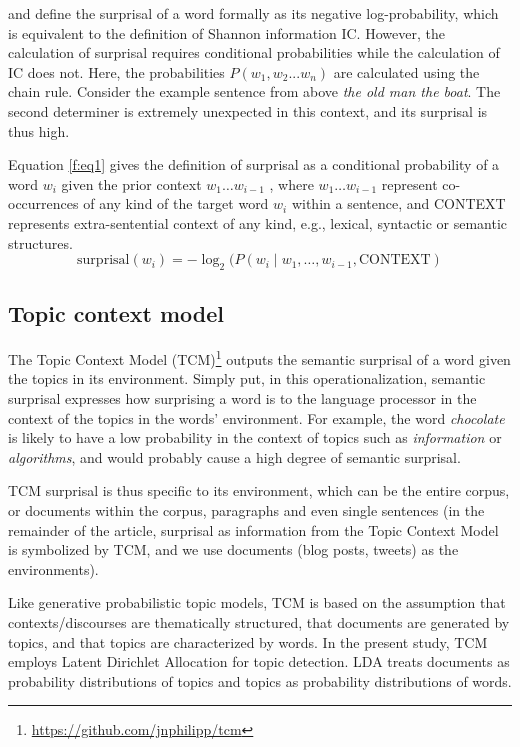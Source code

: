 \documentclass[output=paper,colorlinks,citecolor=brown]{langscibook}
\begin{document}
\citet{hale2001probabilistic} and \citet{hale2015modeling} define the surprisal of a word formally as its negative log-probability, which is equivalent to the definition of Shannon information IC. However, the calculation of surprisal requires conditional probabilities while the calculation of IC does not. Here, the probabilities $P(w_1, w_2 ... w_n)$ are calculated using the chain rule. Consider the example sentence from above \textit{the old man the boat}. The second determiner is extremely unexpected in this context, and its surprisal is  thus high. 

Equation \ref{f:eq1} gives the definition of surprisal as a conditional probability of a word $w_i$ given the prior context $w_1\dots w_{i-1}$ \citep{levy2008expectation}, where $w_1\dots w_{i-1}$  represent co-occurrences of any kind of the target word $w_i$ within a sentence, and CONTEXT represents extra-sentential context of any kind, e.g., lexical, syntactic or semantic structures.
\begin{equation}\label{f:eq1}
\mathrm{surprisal}(w_i) = -\log_2(P(w_i\mid w_1,\dots,w_{i-1}, \mathrm{CONTEXT})
\end{equation}

\subsection{Topic context model}

The Topic Context Model (TCM)\footnote{\url{https://github.com/jnphilipp/tcm}} \citep{koelbl2020keyword,koelbl2021semantic,philipp2022keyword,philipp2023idioms} outputs the semantic surprisal of a word given the topics in its environment. Simply put, in this operationalization, semantic surprisal expresses how surprising a word is to the language processor in the context of the topics in the words' environment. For example, the word \textit{chocolate} is likely to have a low probability in the context of topics such as \textit{information} or \textit{algorithms}, and would probably cause a high degree of semantic surprisal.

TCM surprisal is thus specific to its environment, which can be the entire corpus, or documents within the corpus, paragraphs and even single sentences (in the remainder of the article, surprisal as information from the Topic Context Model is symbolized by TCM, and we use documents (blog posts, tweets) as the environments).

Like generative probabilistic topic models, TCM is based on the assumption that contexts\slash discourses are thematically structured, that documents are generated by topics, and that topics are characterized by words. In the present study, TCM employs Latent Dirichlet Allocation \citep[LDA,][]{blei2003latent} for topic detection. LDA  treats documents as probability distributions of topics and topics as probability distributions of words.
\end{document}
